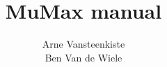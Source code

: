 \documentclass[a4paper, twoside]{article}
\newcommand{\doctitle}{MuMax manual}
\begin{document}
\hypersetup{breaklinks=true}
\setlength{\parindent}{0cm}

\title{\doctitle}
\author{Arne Vansteenkiste\\Ben Van de Wiele}
\maketitle


\tableofcontents


\appendix




\printindex
\end{document}
